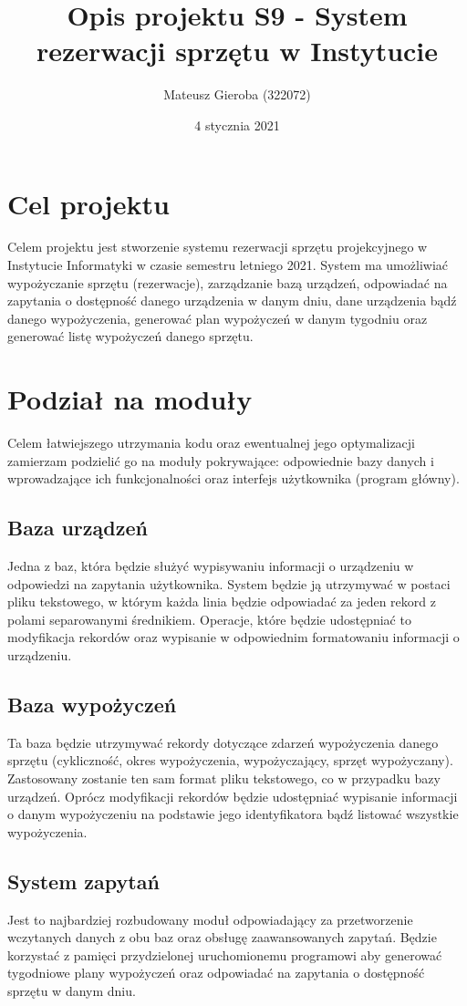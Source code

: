 \documentclass[a4paper]{article}
\author{Mateusz Gieroba (322072)}
\title{Opis projektu S9 - System rezerwacji sprzętu w Instytucie}
\date{4 stycznia 2021}
\begin{document}
\maketitle
\section{Cel projektu}
Celem projektu jest stworzenie systemu rezerwacji sprzętu projekcyjnego w Instytucie Informatyki w czasie semestru letniego 2021. System ma umożliwiać
wypożyczanie sprzętu (rezerwacje), zarządzanie bazą urządzeń, odpowiadać na zapytania o dostępność danego urządzenia w danym dniu, dane urządzenia bądź danego wypożyczenia, generować plan wypożyczeń 
w danym tygodniu oraz generować listę wypożyczeń danego sprzętu.

\section{Podział na moduły}

Celem łatwiejszego utrzymania kodu oraz ewentualnej jego optymalizacji zamierzam podzielić go na moduły pokrywające:
odpowiednie bazy danych i wprowadzające ich funkcjonalności oraz interfejs użytkownika (program główny).

\subsection{Baza urządzeń}
Jedna z baz, która będzie służyć wypisywaniu informacji o urządzeniu w odpowiedzi na zapytania użytkownika.
System będzie ją utrzymywać w postaci pliku tekstowego, w którym każda linia będzie odpowiadać za jeden rekord z polami separowanymi średnikiem. Operacje, które będzie udostępniać to 
modyfikacja rekordów oraz wypisanie w odpowiednim formatowaniu informacji o urządzeniu.

\subsection{Baza wypożyczeń}
Ta baza będzie utrzymywać rekordy dotyczące zdarzeń wypożyczenia danego sprzętu (cykliczność, okres wypożyczenia, wypożyczający, sprzęt wypożyczany).
Zastosowany zostanie ten sam format pliku tekstowego, co w przypadku bazy urządzeń. Oprócz modyfikacji rekordów będzie udostępniać
wypisanie informacji o danym wypożyczeniu na podstawie jego identyfikatora bądź listować wszystkie wypożyczenia.

\subsection{System zapytań}
Jest to najbardziej rozbudowany moduł odpowiadający za przetworzenie wczytanych danych z obu baz oraz obsługę zaawansowanych zapytań.
Będzie korzystać z pamięci przydzielonej uruchomionemu programowi aby generować tygodniowe plany wypożyczeń oraz odpowiadać na zapytania o dostępność sprzętu w danym dniu.
\end{document}
